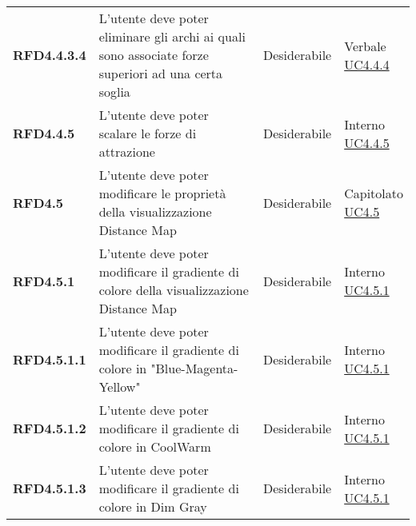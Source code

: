 \begin{longtable}[H]{| >{\raggedright\bfseries}m{20mm} | >{\raggedright}m{90mm} | >{\centering}m{25mm} | >{\centering\arraybackslash}m{30mm}|}
    RFD4.4.3.4
     & L'utente deve poter eliminare gli archi ai quali sono associate forze superiori ad una certa soglia
     & Desiderabile
     & \makecell{ Verbale                                                                                                \\ \hyperref[par:uc4.4.4]{UC4.4.4} }\\

    RFD4.4.5
     & L'utente deve poter scalare le forze di attrazione
     & Desiderabile
     & \makecell{ Interno                                                                                                \\ \hyperref[par:uc4.4.5]{UC4.4.5} }\\

    RFD4.5
     & L'utente deve poter modificare le proprietà della visualizzazione Distance Map
     & Desiderabile
     & \makecell{ Capitolato                                                                                             \\ \hyperref[ssub:uc4.5]{UC4.5} }\\

    RFD4.5.1
     & L'utente deve poter modificare il gradiente di colore della visualizzazione Distance Map
     & Desiderabile
     & \makecell{ Interno                                                                                                \\ \hyperref[par:uc4.5.1]{UC4.5.1} }\\

    RFD4.5.1.1
     & L'utente deve poter modificare il gradiente di colore in "Blue-Magenta-Yellow"
     & Desiderabile
     & \makecell{ Interno                                                                                                \\ \hyperref[par:uc4.5.1]{UC4.5.1} }\\

    RFD4.5.1.2
     & L'utente deve poter modificare il gradiente di colore in CoolWarm
     & Desiderabile
     & \makecell{ Interno                                                                                                \\ \hyperref[par:uc4.5.1]{UC4.5.1} }\\

    RFD4.5.1.3
     & L'utente deve poter modificare il gradiente di colore in Dim Gray
     & Desiderabile
     & \makecell{ Interno                                                                                                \\ \hyperref[par:uc4.5.1]{UC4.5.1} }\\


\end{longtable}

